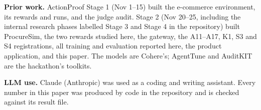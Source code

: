 \textbf{Prior work.} ActionProof Stage 1 (Nov 1--15) built the e-commerce environment, its rewards and runs, and the judge audit. Stage 2 (Nov 20--25, including the internal research phases labelled Stage 3 and Stage 4 in the repository) built ProcureSim, the two rewards studied here, the gateway, the A11--A17, K1, S3 and S4 registrations, all training and evaluation reported here, the product application, and this paper. The models are Cohere's; AgentTune and AuditKIT are the hackathon's toolkits.

\textbf{LLM use.} Claude (Anthropic) was used as a coding and writing assistant. Every number in this paper was produced by code in the repository and is checked against its result file.
